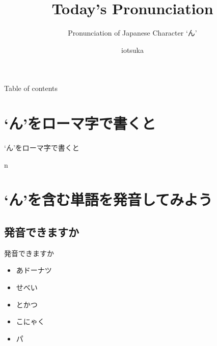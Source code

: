 \documentclass[aspectratio=169,xcolor={dvipsnames,table}]{beamer}
\title{Today's Pronunciation}
\subtitle{Pronunciation of Japanese Character `ん'}
\date[]{\mytoday}
\author{iotsuka}
\institute{Eduop ちば}
\begin{document}
\maketitle

   \begin{frame}[toc]{Table of contents}%
      \tableofcontents%
   \end{frame}

\section{`ん'をローマ字で書くと}
\begin{frame}[plain]{`ん'をローマ字で書くと}

\Huge n

\end{frame}
\section{`ん'を含む単語を発音してみよう}
\subsection{発音できますか}
\begin{frame}[plain]{発音できますか}
 \begin{itemize}
  \item あドーナツ
  \item せべい
  \item とかつ
  \item こにゃく
  \item パ
 \end{itemize}
\end{frame}
\end{document}
